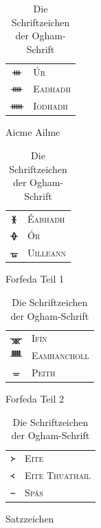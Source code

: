 \documentclass[a4paper]{scrartcl}
\begin{document}
\begin{table}[p]
\begin{center}
\begin{subfigure}[c]{0.24\textwidth}
\begin{tabular}{cl}
        {\oghamfont ᚒ} & \textsc{Úr} \\
        {\oghamfont ᚓ} & \textsc{Eadhadh} \\
        {\oghamfont ᚔ} & \textsc{Iodhadh} \\
      \end{tabular}
      \caption{Aicme Ailme}
    \end{subfigure}
    \begin{subfigure}[c]{0.3\textwidth}
      \centering
      \begin{tabular}{cl}
        {\oghamfont ᚕ} & \textsc{Éabhadh} \\
        {\oghamfont ᚖ} & \textsc{Ór} \\
        {\oghamfont ᚗ} & \textsc{Uilleann} \\
      \end{tabular}
      \caption{Forfeda Teil 1}
    \end{subfigure}
    \begin{subfigure}[c]{0.3\textwidth}
      \centering
      \begin{tabular}{cl}
        {\oghamfont ᚘ} & \textsc{Ifín} \\
        {\oghamfont ᚙ} & \textsc{Eamhancholl} \\
        {\oghamfont ᚚ} & \textsc{Peith} \\
      \end{tabular}
      \caption{Forfeda Teil 2}
    \end{subfigure}
    \begin{subfigure}[c]{0.3\textwidth}
      \centering
      \begin{tabular}{cl}
        {\oghamfont ᚛} & \textsc{Eite} \\
        {\oghamfont ᚜} & \textsc{Eite Thuathail} \\
        {\oghamfont  } & \textsc{Spás} \\
      \end{tabular}
      \caption{Satzzeichen}
    \end{subfigure}
    \caption{Die Schriftzeichen der Ogham-Schrift}
    \label{fig:ogham-chars}
  \end{center}
\end{table}
\end{document}
